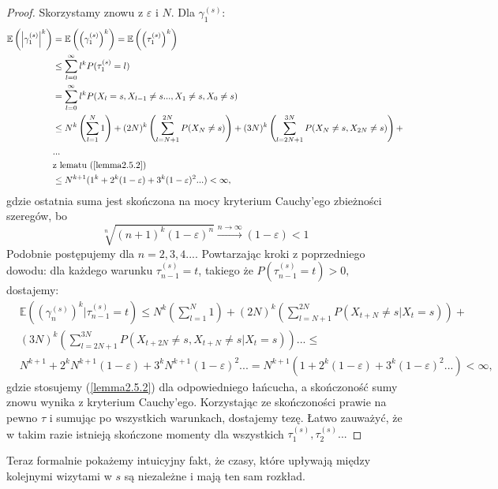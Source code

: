 \documentclass[a4paper]{article}
\theoremstyle{defn}
\theoremstyle{theorem}
\theoremstyle{lemma}
\theoremstyle{cor}
\theoremstyle{fact}
\begin{document}
\begin{proof} Skorzystamy znowu z $\varepsilon$ i $N$. Dla $\gamma_1^{(s)}$:
\begin{align*}
    \mathbb{E}\left(\left|\gamma_1^{(s)}\right|^k\right) &= \mathbb{E}\left(\left(\gamma_1^{(s)}\right)^k\right) = \mathbb{E}\left(\left(\tau_1^{(s)}\right)^k\right)\\
    &\leq \sum\limits_{l = 0}^{\infty} l^k P(\tau_1^{(s)} = l) \\
    &= \sum\limits_{l = 0}^{\infty} l^k P(X_l = s, X_{l-1} \neq s..., X_1 \neq s, X_0 \neq s)\\
    &\leq N^k\left(\sum\limits_{l = 1}^{N} 1\right) + (2N)^k\left(\sum\limits_{l = N+1}^{2N} P(X_N \neq s)\right) + (3N)^k\left(\sum\limits_{l = 2N+1}^{3N} P(X_N \neq s, X_{2N} \neq s)\right)+\\&...\\
    &\text{z lematu (\ref{lemma2.5.2})}\\
    &\leq N^{k+1}(1^{k} + 2^{k}(1-\varepsilon) + 3^{k}(1 - \varepsilon)^2 ...) < \infty,
\end{align*}
gdzie ostatnia suma jest skończona na mocy kryterium Cauchy'ego zbieżności szeregów, bo 
$$\sqrt[n]{(n+1)^{k}(1-\varepsilon)^n} \xrightarrow{n \to \infty} (1-\varepsilon) < 1$$
Podobnie postępujemy dla $n=2,3,4...$. Powtarzając kroki z poprzedniego dowodu: dla każdego warunku $\tau^{(s)}_{n-1} = t$, takiego że $P(\tau^{(s)}_{n-1} = t) > 0,$ dostajemy:
\begin{align*}
    &\mathbb{E}\left(\left(\gamma^{(s)}_n\right)^k|\tau^{(s)}_{n-1} = t\right) \leq 
N^k \left(\sum\limits_{l = 1}^{N} 1\right) + (2N)^k\left(\sum\limits_{l = N+1}^{2N} P(X_{t+N} \neq s| X_t = s)\right) +\\ &(3N)^k\left(\sum\limits_{l = 2N+1}^{3N} P(X_{t+2N} \neq s, X_{t+N} \neq s| X_t = s)\right)...\leq\\
    &N^{k+1} + 2^k N^{k+1}(1-\varepsilon) + 3^k N^{k+1}(1-\varepsilon)^2 ... = N^{k+1}(1 + 2^{k}(1-\varepsilon) + 3^{k}(1 - \varepsilon)^2 ...) < \infty,
\end{align*}
gdzie stosujemy (\ref{lemma2.5.2}) dla odpowiedniego łańcucha, a skończoność sumy znowu wynika z kryterium Cauchy'ego. Korzystając ze skończoności prawie na pewno $\tau$ i sumując po wszystkich warunkach, dostajemy tezę. Łatwo zauważyć, że w takim razie istnieją skończone momenty dla wszystkich $\tau_1^{(s)}, \tau_2^{(s)}...$
\end{proof}
Teraz formalnie pokażemy intuicyjny fakt, że czasy, które upływają między kolejnymi wizytami w $s$ są niezależne i mają ten sam rozkład.
\end{document}
